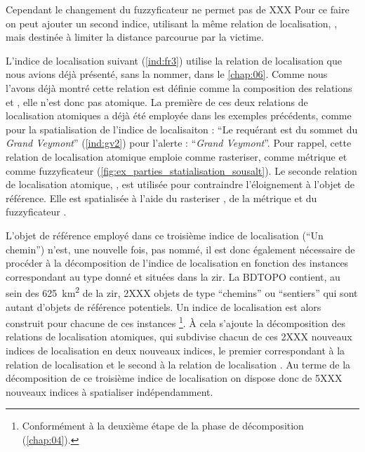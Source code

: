 Cependant le changement du fuzzyficateur ne permet pas de XXX
%
Pour ce faire on peut ajouter un second indice, utilisant la même
relation de localisation, , mais
destinée à limiter la distance parcourue par la victime.
%



L'indice de localisation suivant (\ref{ind:fr3}) utilise la relation
de localisation  que nous avions déjà
présenté, sans la nommer, dans le \autoref{chap:06}. Comme nous
l'avons déjà montré cette relation est définie comme la composition
des relations  et ,
elle n'est donc pas atomique. La première de ces deux relations de
localisation atomiques  a déjà été employée
dans les exemples précédents, comme pour la spatialisation de l'indice
de localisaiton : \enquote{Le requérant est 
  du sommet du \emph{Grand Veymont}} (\ref{ind:gv2}) pour l'alerte :
\enquote{\emph{Grand Veymont}}. Pour rappel, cette relation de
localisation atomique emploie  comme rasteriser,
 comme métrique et
 comme fuzzyficateur
(\autoref{fig:ex_parties_statialisation_sousalt}). Le seconde relation
de localisation atomique, , est utilisée pour
contraindre l'éloignement à l'objet de référence. Elle est spatialisée
à l'aide du rasteriser , de la métrique
 et du fuzzyficateur
.

L'objet de référence employé dans ce troisième indice de localisation
(\enquote{Un chemin}) n'est, une nouvelle fois, pas nommé, il est donc
également nécessaire de procéder à la décomposition de l'indice de
localisation en fonction des instances correspondant au type donné et
situées dans la \ac{zir}. La BDTOPO contient, au sein des
\SI{625}{\kilo\meter\squared} de la \ac{zir}, 2XXX objets de type
\enquote{chemins} ou \enquote{sentiers} qui sont autant d'objets de
référence potentiels. Un indice de localisation est alors construit
pour chacune de ces instances \footnote{Conformément à la deuxième
  étape de la phase de décomposition (\autoref{chap:04}).}. À cela
s'ajoute la décomposition des relations de localisation atomiques, qui
subdivise chacun de ces 2XXX nouveaux indices de localisation en deux
nouveaux indices, le premier correspondant à la relation de
localisation  et le second à la relation de
localisation . Au terme de la décomposition de ce
troisième indice de localisation on dispose donc de 5XXX nouveaux
indices à spatialiser indépendamment.

